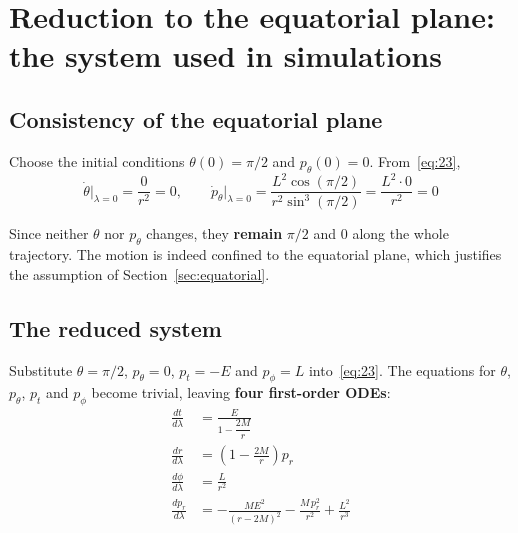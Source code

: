 \documentclass[11pt,a4paper]{article}
\begin{document}
\section{Reduction to the equatorial plane: the system used in simulations}

\subsection{Consistency of the equatorial plane}

Choose the initial conditions $\theta(0) = \pi/2$ and $p_\theta(0) = 0$. From~\eqref{eq:23},
\begin{equation*}
\dot{\theta}\big|_{\lambda=0} = \frac{0}{r^2} = 0, \qquad
\dot{p}_\theta\big|_{\lambda=0} = \frac{L^2 \cos(\pi/2)}{r^2 \sin^3(\pi/2)} = \frac{L^2 \cdot 0}{r^2} = 0
\end{equation*}

Since neither $\theta$ nor $p_\theta$ changes, they \textbf{remain} $\pi/2$ and $0$ along the whole trajectory. The motion is indeed confined to the equatorial plane, which justifies the assumption of Section~\ref{sec:equatorial}.

\subsection{The reduced system}

Substitute $\theta = \pi/2$, $p_\theta = 0$, $p_t = -E$ and $p_\phi = L$ into~\eqref{eq:23}. The equations for $\theta$, $p_\theta$, $p_t$ and $p_\phi$ become trivial, leaving \textbf{four first-order ODEs}:
\begin{equation*}
\boxed{
\begin{aligned}
    \frac{dt}{d\lambda} &= \frac{E}{1 - \dfrac{2M}{r}} \\[6pt]
    \frac{dr}{d\lambda} &= \left(1 - \frac{2M}{r}\right) p_r \\[6pt]
    \frac{d\phi}{d\lambda} &= \frac{L}{r^2} \\[6pt]
    \frac{dp_r}{d\lambda} &= -\frac{M E^2}{(r - 2M)^2} - \frac{M\, p_r^2}{r^2} + \frac{L^2}{r^3}
\end{aligned}
} \tag{24}\label{eq:24}
\end{equation*}
\end{document}
